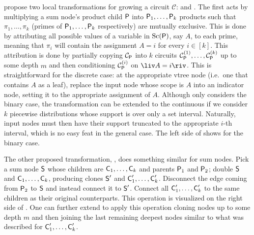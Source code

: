 \citet{liang17} propose two local transformations for growing a circuit $\mathcal{C}$:
 and . The first acts by multiplying a sum node's product child
$\operatorname{\textup{\textsf{P}}}$ into $\operatorname{\textup{\textsf{P}}}_1,\ldots,\operatorname{\textup{\textsf{P}}}_k$ products such that $\pi_1,\ldots,\pi_k$ (primes of
$\operatorname{\textup{\textsf{P}}}_1,\ldots,\operatorname{\textup{\textsf{P}}}_k$ respectively) are mutually exclusive. This is done by attributing all
possible values of a variable in $\operatorname*{\normalfont{Sc}}(\operatorname{\textup{\textsf{P}}})$, say $A$, to each prime, meaning that $\pi_i$ will
contain the assignment $A=i$ for every $i\in\left[k\right]$. This attribution is done by partially
copying $\mathcal{C}_{\operatorname{\textup{\textsf{P}}}}$ into $k$ circuits $\mathcal{C}_{\operatorname{\textup{\textsf{P}}}}^{(1)},\ldots,
\mathcal{C}_{\operatorname{\textup{\textsf{P}}}}^{(k)}$ up to some depth $m$ and then conditioning $\mathcal{C}_{\operatorname{\textup{\textsf{P}}}}^{(i)}$
on $\liv A=i\riv$. This is straightforward for the discrete case: at the appropriate vtree node
(i.e.\ one that contains $A$ as a leaf), replace the input node whose scope is $A$ into an
indicator node, setting it to the appropriate assignment of $A$. Although \citet{liang17} only
considers the binary case, the transformation can be extended to the continuous if we consider $k$
piecewise distributions whose support is over only a set interval. Naturally, input nodes must then
have their support truncated to the appropriate $i$-th interval, which is no easy feat in the
general case. The left side of  shows  for the binary case.

The other proposed transformation, , does something similar for sum nodes. Pick a
sum node $\operatorname{\textup{\textsf{S}}}$ whose children are $\operatorname{\textup{\textsf{C}}}_1,\ldots,\operatorname{\textup{\textsf{C}}}_k$ and parents $\operatorname{\textup{\textsf{P}}}_1$ and $\operatorname{\textup{\textsf{P}}}_2$;
double $\operatorname{\textup{\textsf{S}}}$ and $\operatorname{\textup{\textsf{C}}}_1,\ldots,\operatorname{\textup{\textsf{C}}}_k$, producing clones $\operatorname{\textup{\textsf{S}}}'$ and $\operatorname{\textup{\textsf{C}}}_1',\ldots,
\operatorname{\textup{\textsf{C}}}_k'$. Disconnect the edge coming from $\operatorname{\textup{\textsf{P}}}_2$ to $\operatorname{\textup{\textsf{S}}}$ and instead connect it to $\operatorname{\textup{\textsf{S}}}'$.
Connect all $\operatorname{\textup{\textsf{C}}}_1',\ldots,\operatorname{\textup{\textsf{C}}}_k'$ to the same children as their original counterparts. This
operation is visualized on the right side of . One can further extend
 to apply this operation cloning nodes up to some depth $m$ and then joining the
last remaining deepest nodes similar to what was described for $\operatorname{\textup{\textsf{C}}}_1',\ldots,\operatorname{\textup{\textsf{C}}}_k'$.

